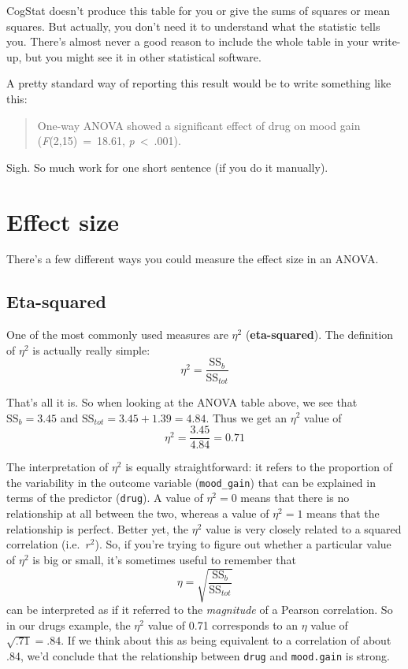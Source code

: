 \documentclass[
]{book}
\theoremstyle{definition}
\theoremstyle{definition}
\theoremstyle{definition}
\theoremstyle{definition}
\theoremstyle{remark}
\begin{document}
CogStat doesn't produce this table for you or give the sums of squares or mean squares. But actually, you don't need it to understand what the statistic tells you. There's almost never a good reason to include the whole table in your write-up, but you might see it in other statistical software.

A pretty standard way of reporting this result would be to write something like this:

\begin{quote}
One-way ANOVA showed a significant effect of drug on mood gain (\emph{F}(2,15)~=~18.61, \emph{p}~\textless~.001).
\end{quote}

Sigh. So much work for one short sentence (if you do it manually).

\hypertarget{anovaeffect}{%
\section{Effect size}\label{anovaeffect}}

There's a few different ways you could measure the effect size in an ANOVA.

\hypertarget{eta-squared}{%
\subsection{Eta-squared}\label{eta-squared}}

One of the most commonly used measures are \(\eta^2\) (\textbf{eta-squared}). The definition of \(\eta^2\) is actually really simple:
\[
\eta^2 = \frac{\mbox{SS}_b}{\mbox{SS}_{tot}}
\]

That's all it is. So when looking at the ANOVA table above, we see that \(\mbox{SS}_b = 3.45\) and \(\mbox{SS}_{tot} = 3.45 + 1.39 = 4.84\). Thus we get an \(\eta^2\) value of
\[
\eta^2 = \frac{3.45}{4.84} = 0.71
\]

The interpretation of \(\eta^2\) is equally straightforward: it refers to the proportion of the variability in the outcome variable (\texttt{mood\_gain}) that can be explained in terms of the predictor (\texttt{drug}). A value of \(\eta^2 = 0\) means that there is no relationship at all between the two, whereas a value of \(\eta^2 = 1\) means that the relationship is perfect. Better yet, the \(\eta^2\) value is very closely related to a squared correlation (i.e.~\(r^2\)). So, if you're trying to figure out whether a particular value of \(\eta^2\) is big or small, it's sometimes useful to remember that
\[
\eta= \sqrt{\frac{\mbox{SS}_b}{\mbox{SS}_{tot}}}
\]
can be interpreted as if it referred to the \emph{magnitude} of a Pearson correlation. So in our drugs example, the \(\eta^2\) value of 0.71 corresponds to an \(\eta\) value of \(\sqrt{.71} = .84\). If we think about this as being equivalent to a correlation of about .84, we'd conclude that the relationship between \texttt{drug} and \texttt{mood.gain} is strong.
\end{document}
